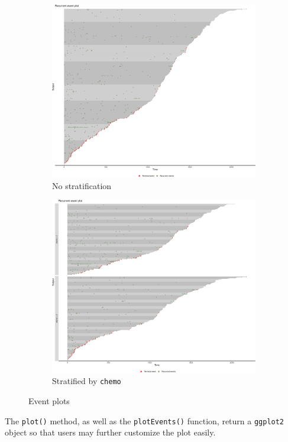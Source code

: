 \vspace*{-.3cm}\begin{figure}[H]
\centering
\begin{subfigure}[t]{1.8in}
\centering
\includegraphics[scale = .125]{images/ep-1}
\caption{No stratification}\label{fig:1a}
\end{subfigure}
\quad
\begin{subfigure}[t]{1.8in}
\centering
\includegraphics[scale = .125]{images/ep-2}
\caption{Stratified by \texttt{chemo}}\label{fig:1b}
\end{subfigure}
\caption{Event plots}\label{fig:1}
\end{figure}

The \texttt{plot()} method, as well as the \texttt{plotEvents()}
function, return a \texttt{ggplot2} object \citep{hadley2016ggplot2} so
that users may further customize the plot easily.
